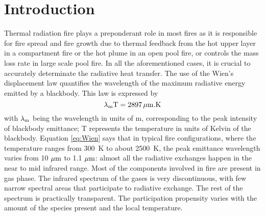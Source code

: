 

\chapter{Introduction}

Thermal radiation fire plays a preponderant role in most fires as it is responsible for fire spread and fire growth due to thermal feedback from the hot upper layer in a compartment fire or the hot plume in an open pool fire, or controls the mass loss rate in large scale pool fire.
In all the aforementioned cases, it is crucial to accurately determinate the radiative heat transfer. The use of the Wien's displacement law quantifies the wavelength of the maximum radiative energy emitted by a blackbody. This law is expressed
by
\begin{equation}\label{eq:Wien}
 \rm \lambda_m T = 2897 \, \mu m.K
\end{equation}
with $\rm \lambda_m$ being the wavelength in units of m, corresponding to the peak intensity of blackbody emittance; T represents the temperature in units of Kelvin of the blackbody. Equation \ref{eq:Wien} says that in typical fire configurations, where the temperature ranges from 300~K to about 2500~K, the peak emittance wavelength varies from 10 $\rm \mu m$ to 1.1 $\rm \mu m$: almost all the radiative exchanges happen in the near to mid infrared range. Most of the components involved in fire are present in gas phase. The infrared spectrum of the gases is very discontinuous, with few narrow spectral areas that participate to radiative exchange. The rest of the spectrum is practically transparent. The participation propensity varies with the amount of the species present and the local temperature.

